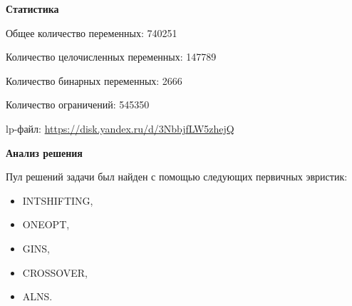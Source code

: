 \documentclass[%
	11pt,
	a4paper,
	utf8,
		]{article}
\begin{document}
\textbf{Статистика}\vspace*{1mm}

Общее количество переменных: 740251

Количество целочисленных переменных: 147789

Количество бинарных переменных: 2666

Количество ограничений: 545350

lp-файл: \url{https://disk.yandex.ru/d/3NbbjfLW5zhejQ}

\vspace*{5mm}\textbf{Анализ решения}\vspace*{1mm}

Пул решений задачи был найден с помощью следующих первичных эвристик:
\begin{itemize}
	\item INTSHIFTING,
	
	\item ONEOPT,
	
	\item GINS,
	
	\item CROSSOVER,
	
	\item ALNS.
\end{itemize}
\end{document}
